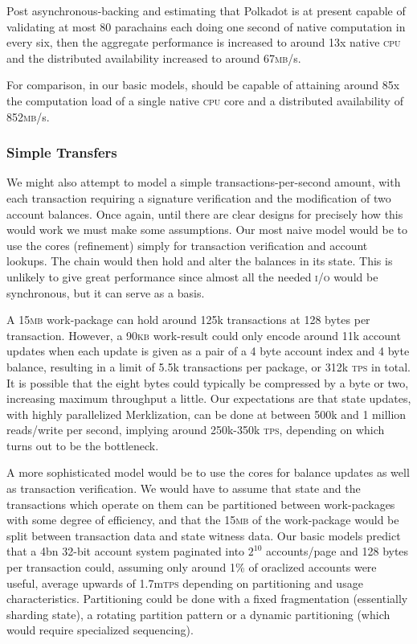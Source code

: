 Post asynchronous-backing and estimating that Polkadot is at present capable of validating at most 80 parachains each doing one second of native computation in every six, then the aggregate performance is increased to around 13x native \textsc{cpu} and the distributed availability increased to around 67\textsc{mb}/s.

For comparison, in our basic models, \Jam should be capable of attaining around 85x the computation load of a single native \textsc{cpu} core and a distributed availability of 852\textsc{mb}/s.
\subsubsection{Simple Transfers}
We might also attempt to model a simple transactions-per-second amount, with each transaction requiring a signature verification and the modification of two account balances. Once again, until there are clear designs for precisely how this would work we must make some assumptions. Our most naive model would be to use the \Jam cores (\ie refinement) simply for transaction verification and account lookups. The \Jam chain would then hold and alter the balances in its state. This is unlikely to give great performance since almost all the needed \textsc{i/o} would be synchronous, but it can serve as a basis.

A 15\textsc{mb} work-package can hold around 125k transactions at 128 bytes per transaction. However, a 90\textsc{kb} work-result could only encode around 11k account updates when each update is given as a pair of a 4 byte account index and 4 byte balance, resulting in a limit of 5.5k transactions per package, or 312k \textsc{tps} in total. It is possible that the eight bytes could typically be compressed by a byte or two, increasing maximum throughput a little. Our expectations are that state updates, with highly parallelized Merklization, can be done at between 500k and 1 million reads/write per second, implying around 250k-350k \textsc{tps}, depending on which turns out to be the bottleneck.

A more sophisticated model would be to use the \Jam cores for balance updates as well as transaction verification. We would have to assume that state and the transactions which operate on them can be partitioned between work-packages with some degree of efficiency, and that the 15\textsc{mb} of the work-package would be split between transaction data and state witness data. Our basic models predict that a 4bn 32-bit account system paginated into $2^{10}$ accounts/page and 128 bytes per transaction could, assuming only around 1\% of oraclized accounts were useful, average upwards of 1.7m\textsc{tps} depending on partitioning and usage characteristics. Partitioning could be done with a fixed fragmentation (essentially sharding state), a rotating partition pattern or a dynamic partitioning (which would require specialized sequencing).

